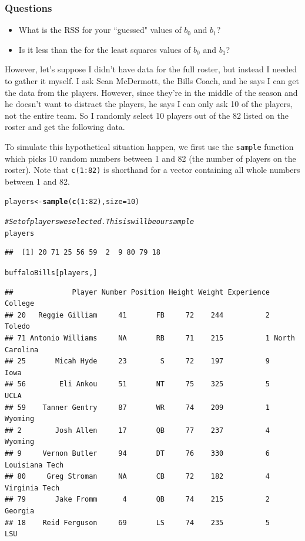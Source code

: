 \documentclass{article}\usepackage[]{graphicx}\usepackage[]{color}
\makeatletter
\newcommand{\hlnum}[1]{\textcolor[rgb]{0.686,0.059,0.569}{#1}}%
\newcommand{\hlcom}[1]{\textcolor[rgb]{0.678,0.584,0.686}{\textit{#1}}}%
\newcommand{\hlopt}[1]{\textcolor[rgb]{0,0,0}{#1}}%
\newcommand{\hlstd}[1]{\textcolor[rgb]{0.345,0.345,0.345}{#1}}%
\newcommand{\hlkwb}[1]{\textcolor[rgb]{0.69,0.353,0.396}{#1}}%
\newcommand{\hlkwc}[1]{\textcolor[rgb]{0.333,0.667,0.333}{#1}}%
\newcommand{\hlkwd}[1]{\textcolor[rgb]{0.737,0.353,0.396}{\textbf{#1}}}%
\newenvironment{kframe}{%
 \def\at@end@of@kframe{}%
 \ifinner\ifhmode%
  \def\at@end@of@kframe{\end{minipage}}%
  \begin{minipage}{\columnwidth}%
 \fi\fi%
 \def\FrameCommand##1{\hskip\@totalleftmargin \hskip-\fboxsep
 \colorbox{shadecolor}{##1}\hskip-\fboxsep
     \hskip-\linewidth \hskip-\@totalleftmargin \hskip\columnwidth}%
 \MakeFramed {\advance\hsize-\width
   \@totalleftmargin\z@ \linewidth\hsize
   \@setminipage}}%
 {\par\unskip\endMakeFramed%
 \at@end@of@kframe}
\newenvironment{knitrout}{}{} %
\makeatother
\begin{document}
\subsubsection*{Questions}
\begin{itemize}
\item What is the RSS for your ``guessed" values of $b_0$ and $b_1$?
\item Is it less than the  for the least squares values of $b_0$ and $b_1$?
\end{itemize}

However, let's suppose I didn't have data for the full roster, but instead I needed to gather it myself. I ask Sean McDermott, the Bills Coach, and he says I can get the data from the players. However, since they're in the middle of the season and he doesn't want to distract the players, he says I can only ask 10 of the players, not the entire team. So I randomly select 10 players out of the 82 listed on the roster and get the following data. 

To simulate this hypothetical situation happen, we first use the \texttt{sample} function which picks 10 random numbers between 1 and 82 (the number of players on the roster). Note that \texttt{c(1:82)} is shorthand for a vector containing all whole numbers between 1 and 82. 
\begin{knitrout}
\color{fgcolor}\begin{kframe}
\begin{alltt}
\hlstd{players} \hlkwb{<-} \hlkwd{sample}\hlstd{(}\hlkwd{c}\hlstd{(}\hlnum{1}\hlopt{:}\hlnum{82}\hlstd{),} \hlkwc{size} \hlstd{=} \hlnum{10}\hlstd{)}

\hlcom{# Set of players we selected. This is will be our sample}
\hlstd{players}
\end{alltt}
\begin{verbatim}
##  [1] 20 71 25 56 59  2  9 80 79 18
\end{verbatim}
\begin{alltt}
\hlstd{buffaloBills[players, ]}
\end{alltt}
\begin{verbatim}
##              Player Number Position Height Weight Experience        College
## 20   Reggie Gilliam     41       FB     72    244          2         Toledo
## 71 Antonio Williams     NA       RB     71    215          1 North Carolina
## 25       Micah Hyde     23        S     72    197          9           Iowa
## 56        Eli Ankou     51       NT     75    325          5           UCLA
## 59    Tanner Gentry     87       WR     74    209          1        Wyoming
## 2        Josh Allen     17       QB     77    237          4        Wyoming
## 9     Vernon Butler     94       DT     76    330          6 Louisiana Tech
## 80     Greg Stroman     NA       CB     72    182          4  Virginia Tech
## 79       Jake Fromm      4       QB     74    215          2        Georgia
## 18    Reid Ferguson     69       LS     74    235          5            LSU
\end{verbatim}
\end{kframe}
\end{knitrout}
\end{document}
